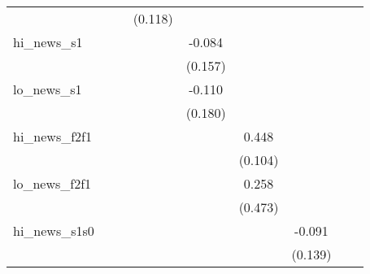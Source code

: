 {\begin{tabular}{l*{8}{c}}
            &                     &                     &     (0.118)         &                     &                     &                     &                     &                     \\
\addlinespace
hi\_news\_s1  &                     &                     &                     &      -0.084         &                     &                     &                     &                     \\
            &                     &                     &                     &     (0.157)         &                     &                     &                     &                     \\
\addlinespace
lo\_news\_s1  &                     &                     &                     &      -0.110         &                     &                     &                     &                     \\
            &                     &                     &                     &     (0.180)         &                     &                     &                     &                     \\
\addlinespace
hi\_news\_f2f1&                     &                     &                     &                     &       0.448\sym{***}&                     &                     &                     \\
            &                     &                     &                     &                     &     (0.104)         &                     &                     &                     \\
\addlinespace
lo\_news\_f2f1&                     &                     &                     &                     &       0.258         &                     &                     &                     \\
            &                     &                     &                     &                     &     (0.473)         &                     &                     &                     \\
\addlinespace
hi\_news\_s1s0&                     &                     &                     &                     &                     &      -0.091         &                     &                     \\
            &                     &                     &                     &                     &                     &     (0.139)         &                     &                     \\

\end{tabular}}
